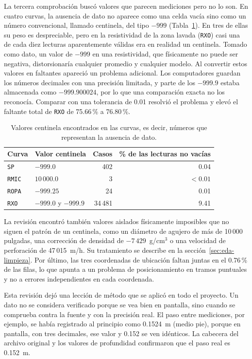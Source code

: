 \documentclass[11pt,a4paper]{article}
\begin{document}
La tercera comprobación buscó valores que parecen mediciones pero no lo son. En cuatro curvas, la ausencia de dato no aparece como una celda vacía sino como un número convencional, llamado centinela, del tipo $-999$ (Tabla~\ref{tab:centinelas}). En tres de ellas su peso es despreciable, pero en la resistividad de la zona lavada (\texttt{RXO}) casi una de cada diez lecturas aparentemente válidas era en realidad un centinela. Tomado como dato, un valor de $-999$ en una resistividad, que físicamente no puede ser negativa, distorsionaría cualquier promedio y cualquier modelo. Al convertir estos valores en faltantes apareció un problema adicional. Los computadores guardan los números decimales con una precisión limitada, y parte de los $-999.9$ estaba almacenada como $-999.900024$, por lo que una comparación exacta no los reconocía. Comparar con una tolerancia de 0.01 resolvió el problema y elevó el faltante total de \texttt{RXO} de 75.66\,\% a 76.80\,\%.

\begin{table}[htbp]
\centering
\small
\caption{Valores centinela encontrados en las curvas, es decir, números que representan la ausencia de dato.}
\label{tab:centinelas}
\begin{tabular}{llrr}
\toprule
\textbf{Curva} & \textbf{Valor centinela} & \textbf{Casos} & \textbf{\% de las lecturas no vacías} \\
\midrule
\texttt{SP}   & $-999.0$            & 402      & 0.04 \\
\texttt{RMIC} & $10\,000.0$         & 3        & $<0.01$ \\
\texttt{ROPA} & $-999.25$           & 24       & 0.01 \\
\texttt{RXO}  & $-999.0$ y $-999.9$ & 34\,481  & 9.41 \\
\bottomrule
\end{tabular}
\end{table}

La revisión encontró también valores aislados físicamente imposibles que no siguen el patrón de un centinela, como un diámetro de agujero de más de 10\,000 pulgadas, una corrección de densidad de $-7\,429$~g/cm$^3$ o una velocidad de perforación de 47\,015~m/h. Su tratamiento se describe en la sección~\ref{sec:eda-limpieza}. Por último, las tres coordenadas de ubicación faltan juntas en el 0.76\,\% de las filas, lo que apunta a un problema de posicionamiento en tramos puntuales y no a errores independientes en cada coordenada.

Esta revisión dejó una lección de método que se aplicó en todo el proyecto. Un dato no se considera verificado porque se vea bien en pantalla, sino cuando se comprueba contra la fuente y con la precisión real. El paso entre mediciones, por ejemplo, se había registrado al principio como 0.1524~m (medio pie), porque en pantalla, con tres decimales, ese valor y 0.152 se ven idénticos. La cabecera del archivo original y los valores de profundidad confirmaron que el paso real es 0.152~m.
\end{document}
